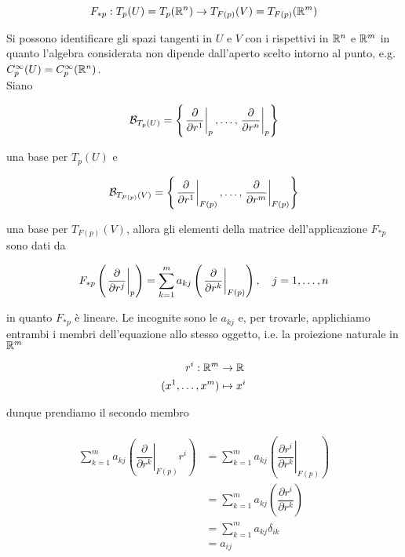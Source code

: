 \begin{equation}
	F_{*p} : T_{p}(U) = T_{p}(\mathbb{R}^{n}) \to T_{F(p)}(V) = T_{F(p)}(\mathbb{R}^{m})
\end{equation}

Si possono identificare gli spazi tangenti in $ U $ e $ V $ con i rispettivi in $ \mathbb{R}^{n} $ e $ \mathbb{R}^{m} $ in quanto l'algebra considerata non dipende dall'aperto scelto intorno al punto, e.g. $ C_{p}^{\infty}(U) = C_{p}^{\infty}(\mathbb{R}^{n}) $.\\
Siano

\begin{equation}
	\mathcal{B}_{T_{p}(U)} = \left\{ \eval{ \pdv{r^{1}} }_{p}, \dots, \eval{ \pdv{r^{n}} }_{p} \right\}
\end{equation}

una base per $ T_{p}(U) $ e

\begin{equation}
	\mathcal{B}_{T_{F(p)}(V)} = \left\{ \eval{ \pdv{r^{1}} }_{F(p)}, \dots, \eval{ \pdv{r^{m}} }_{F(p)} \right\}
\end{equation}

una base per $ T_{F(p)}(V) $, allora gli elementi della matrice dell'applicazione $ F_{*p} $ sono dati da

\begin{equation}
	F_{*p} \left( \left. \dfrac{\partial}{\partial r^{j}} \right|_{p} \right) = \sum_{k=1}^{m} a_{kj} \left( \left. \dfrac{\partial}{\partial r^{k}} \right|_{F(p)} \right) \qcomma j=1,\dots,n
\end{equation}

in quanto $ F_{*p} $ è lineare. Le incognite sono le $ a_{kj} $ e, per trovarle, applichiamo entrambi i membri dell'equazione allo stesso oggetto, i.e. la proiezione naturale in $ \mathbb{R}^{m} $

\begin{align}
	\begin{split}
		r^{i} : \mathbb{R}^{m} &\to \mathbb{R}\\
		(x^{1},\dots,x^{m}) &\mapsto x^{i}
	\end{split}
\end{align}

dunque prendiamo il secondo membro

\begin{align}
	\begin{split}
		\sum_{k=1}^{m} a_{kj} \left( \left. \dfrac{\partial}{\partial r^{k}} \right|_{F(p)} r^{i} \right) &= \sum_{k=1}^{m} a_{kj} \left( \left. \dfrac{\partial r^{i}}{\partial r^{k}} \right|_{F(p)} \right)\\
		&= \sum_{k=1}^{m} a_{kj} \left( \dfrac{\partial r^{i}}{\partial r^{k}} \right)\\
		&= \sum_{k=1}^{m} a_{kj} \delta_{ik}\\
		&= a_{ij}
	\end{split}
\end{align}

